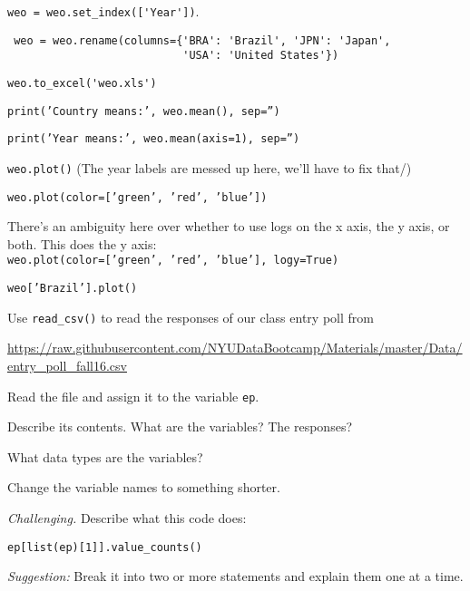 \documentclass[11pt]{exam}
\begin{document}
\begin{questions}
\begin{solution}
\begin{parts}
\item \verb|weo = weo.set_index(['Year'])|.

\item \verb| weo = weo.rename(columns={'BRA': 'Brazil', 'JPN': 'Japan', | \\
      \verb|                           'USA': 'United States'})|

\item \verb|weo.to_excel('weo.xls')|

\item {\tt print('Country means:', weo.mean(), sep='')}

\item {\tt print('Year means:', weo.mean(axis=1), sep='')}

\item {\tt weo.plot()}
(The year labels are messed up here, we'll have to fix that/)

\item {\tt weo.plot(color=['green', 'red', 'blue'])}

\item There's an ambiguity here over whether to use logs on the x axis, the y axis, or both.  This does the y axis:  \\ {\tt weo.plot(color=['green', 'red', 'blue'], logy=True)}

\item {\tt weo['Brazil'].plot()}

\end{parts}
\end{solution}

\item Use \verb|read_csv()| to read the responses of our class entry poll from

\vspace{0.1in}
\centerline{\url{https://raw.githubusercontent.com/NYUDataBootcamp/Materials/master/Data/entry_poll_fall16.csv}}
\vspace{0.1in}

\begin{parts}
\item Read the file and assign it to the variable {\tt ep}.
\item Describe its contents.  What are the variables?  The responses?
\item What data types are the variables?
\item Change the variable names to something shorter.
\item {\it Challenging.\/}
Describe what this code does:
\begin{verbatim}
ep[list(ep)[1]].value_counts()
\end{verbatim}
{\it Suggestion:\/} Break it into two or more statements and explain them one at a time.
\end{parts}


\end{questions}
\end{document}
